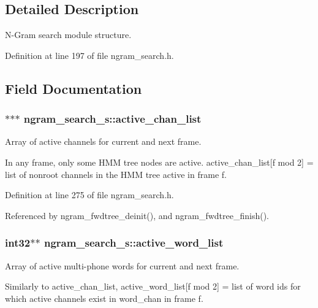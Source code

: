 \subsection{Detailed Description}
N-\/\+Gram search module structure. 

Definition at line 197 of file ngram\+\_\+search.\+h.



\subsection{Field Documentation}
\subsubsection[{active\+\_\+chan\+\_\+list}]{$\ast$$\ast$$\ast$ ngram\+\_\+search\+\_\+s\+::active\+\_\+chan\+\_\+list}\label{structngram__search__s_a83731bf0e2234e632c5e78f2321f5b2d}


Array of active channels for current and next frame. 

In any frame, only some H\+M\+M tree nodes are active. active\+\_\+chan\+\_\+list[f mod 2] = list of nonroot channels in the H\+M\+M tree active in frame f. 

Definition at line 275 of file ngram\+\_\+search.\+h.



Referenced by ngram\+\_\+fwdtree\+\_\+deinit(), and ngram\+\_\+fwdtree\+\_\+finish().

\subsubsection[{active\+\_\+word\+\_\+list}]{\setlength{\rightskip}{0pt plus 5cm}int32$\ast$$\ast$ ngram\+\_\+search\+\_\+s\+::active\+\_\+word\+\_\+list}\label{structngram__search__s_a5056573bf95990cc28c97a56cd76ce9a}


Array of active multi-\/phone words for current and next frame. 

Similarly to active\+\_\+chan\+\_\+list, active\+\_\+word\+\_\+list[f mod 2] = list of word ids for which active channels exist in word\+\_\+chan in frame f.


